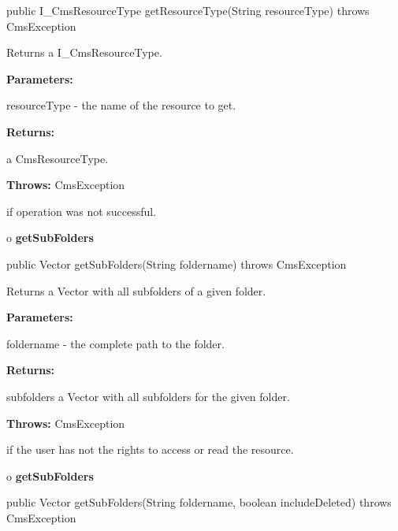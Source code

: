 \begin{PRE}
 public I\_CmsResourceType getResourceType(String resourceType) throws CmsException
\end{PRE}

\begin{description}
\htmlDD Returns a I\_CmsResourceType. 

\begin{description}
\item {\bf Parameters:}  

resourceType - the name of the resource to get.  
\item {\bf Returns:}  

a CmsResourceType.  
\item {\bf Throws:} CmsException  

if operation was not successful.  
\end{description}

\end{description}

o {\bf getSubFolders} 

\begin{PRE}
 public Vector getSubFolders(String foldername) throws CmsException
\end{PRE}

\begin{description}
\htmlDD Returns a Vector with all subfolders of a given folder. 

\begin{description}
\item {\bf Parameters:}  

foldername - the complete path to the folder.  
\item {\bf Returns:}  

subfolders a Vector with all subfolders for the given folder.  
\item {\bf Throws:} CmsException  

if the user has not the rights to access or read the resource.  
\end{description}

\end{description}

o {\bf getSubFolders} 

\begin{PRE}
 public Vector getSubFolders(String foldername,
                             boolean includeDeleted) throws CmsException
\end{PRE}

